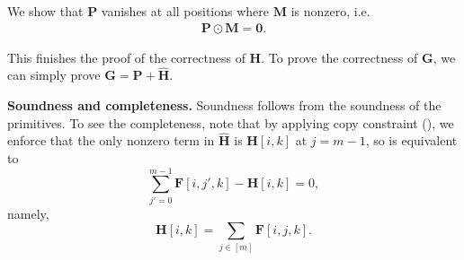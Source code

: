 We show that $\mathbf{P}$ vanishes at all positions where $\mathbf{M}$ is nonzero, i.e.
\begin{align}
  \mathbf{P}\odot \mathbf{M} = \mathbf{0}.
\end{align}

This finishes the proof of the correctness of $\mathbf{H}$.
  To prove the correctness of $\mathbf{G}$, we can simply prove $\mathbf{G} = \mathbf{P} + \widehat{\mathbf{H}}$.

\smallskip
\noindent
\textbf{Soundness and completeness.}
Soundness follows from the soundness of the primitives.
To see the completeness, note that
by applying copy constraint (),
we enforce that the only nonzero term in $\widehat{\mathbf{H}}$ is
$\mathbf{H}[i,k]$ at $j=m-1$, so  is equivalent to
\[
    \sum_{j'=0}^{m-1}\mathbf{F}[i,j',k]-\mathbf{H}[i,k]=0,
\]
namely,
\[
    \mathbf{H}[i,k]=\sum_{j\in[m]}\mathbf{F}[i,j,k].
\]

